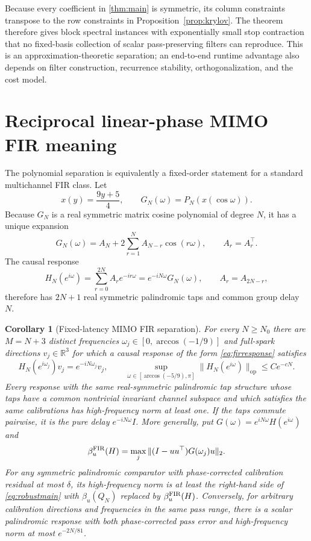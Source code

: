 \documentclass[11pt]{article}
\newtheorem{corollary}[theorem]{Corollary}
\theoremstyle{remark}
\newcommand{\R}{\mathbb{R}}
\newcommand{\op}{\mathrm{op}}
\begin{document}
Because every coefficient in \cref{thm:main} is symmetric, its column
constraints transpose to the row constraints in Proposition~\ref{prop:krylov}.  The
theorem therefore gives block spectral instances with exponentially small stop
contraction that no fixed-basis collection of scalar pass-preserving filters
can reproduce.  This is an approximation-theoretic separation; an end-to-end
runtime advantage also depends on filter construction, recurrence stability,
orthogonalization, and the cost model.

\section{Reciprocal linear-phase MIMO FIR meaning}

The polynomial separation is equivalently a fixed-order statement for a
standard multichannel FIR class.  Let
\[
 x(y)=\frac{9y+5}{4},\qquad G_N(\omega)=P_N(x(\cos\omega)).
\]
Because $G_N$ is a real symmetric matrix cosine polynomial of degree $N$, it
has a unique expansion
\[
 G_N(\omega)=A_N+2\sum_{r=1}^{N}A_{N-r}\cos(r\omega),
 \qquad A_r=A_r^\top.
\]
The causal response
\begin{equation}\label{eq:firresponse}
 H_N(e^{i\omega})=\sum_{r=0}^{2N}A_re^{-ir\omega}
                  =e^{-iN\omega}G_N(\omega),
 \qquad A_r=A_{2N-r},
\end{equation}
therefore has $2N+1$ real symmetric palindromic taps and common group delay
$N$.

\begin{corollary}[Fixed-latency MIMO FIR separation]\label{cor:fir}
For every $N\ge N_0$ there are $M=N+3$ distinct frequencies
$\omega_j\in[0,\arccos(-1/9)]$ and full-spark directions
$v_j\in\R^{3}$ for which a causal response of the form
\eqref{eq:firresponse} satisfies
\[
 H_N(e^{i\omega_j})v_j=e^{-iN\omega_j}v_j,
 \qquad
 \sup_{\omega\in[\arccos(-5/9),\pi]}
       \|H_N(e^{i\omega})\|_{\op}\le Ce^{-cN}.
\]
Every response with the same real-symmetric palindromic tap structure whose
taps have a common nontrivial invariant channel subspace and which satisfies
the same calibrations has high-frequency norm at least one.  If the taps
commute pairwise, it is the pure delay $e^{-iN\omega}I$.
More generally, put $G(\omega)=e^{iN\omega}H(e^{i\omega})$ and
\[
 \beta_u^{\rm FIR}(H)=
 \max_j\|(I-uu^\top)G(\omega_j)u\|_2.
\]
For any symmetric palindromic comparator with phase-corrected calibration
residual at most $\delta$, its high-frequency norm is at least the right-hand
side of \eqref{eq:robustmain} with $\beta_u(Q_N)$ replaced by
$\beta_u^{\rm FIR}(H)$.  Conversely, for arbitrary calibration directions and
frequencies in the same pass range, there is a scalar palindromic response with
both phase-corrected pass error and high-frequency norm at most $e^{-2N/81}$.
\end{corollary}
\end{document}
